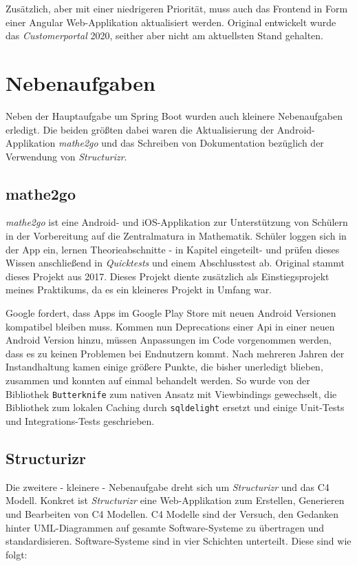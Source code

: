 Zusätzlich, aber mit einer niedrigeren Priorität, muss auch das Frontend in Form einer Angular Web-Applikation aktualisiert werden. Original entwickelt wurde das \textit{Customerportal} 2020, seither aber nicht am aktuellsten Stand gehalten.

\section{Nebenaufgaben}

Neben der Hauptaufgabe um Spring Boot wurden auch kleinere Nebenaufgaben erledigt. Die beiden größten dabei waren die Aktualisierung der Android-Applikation \textit{mathe2go} und das Schreiben von Dokumentation bezüglich der Verwendung von \textit{Structurizr}. 

\subsection{mathe2go}

\textit{mathe2go} ist eine Android- und iOS-Applikation zur Unterstützung von Schülern in der Vorbereitung auf die Zentralmatura in Mathematik. Schüler loggen sich in der App ein, lernen Theorieabschnitte - in Kapitel eingeteilt- und prüfen dieses Wissen anschließend in \textit{Quicktests} und einem Abschlusstest ab. Original stammt dieses Projekt aus 2017. Dieses Projekt diente zusätzlich als Einstiegsprojekt meines Praktikums, da es ein kleineres Projekt in Umfang war.

Google fordert, dass Apps im Google Play Store mit neuen Android Versionen kompatibel bleiben muss. Kommen nun Deprecations einer Api in einer neuen Android Version hinzu, müssen Anpassungen im Code vorgenommen werden, dass es zu keinen Problemen bei Endnutzern kommt. Nach mehreren Jahren der Instandhaltung kamen einige größere Punkte, die bisher unerledigt blieben, zusammen und konnten auf einmal behandelt werden. So wurde von der Bibliothek \texttt{Butterknife} zum nativen Ansatz mit Viewbindings gewechselt, die Bibliothek zum lokalen Caching durch \texttt{sqldelight} ersetzt und einige Unit-Tests und Integrations-Tests geschrieben.

\subsection{Structurizr}

Die zweitere - kleinere - Nebenaufgabe dreht sich um \textit{Structurizr} und das C4 Modell. Konkret ist \textit{Structurizr} eine Web-Applikation zum Erstellen, Generieren und Bearbeiten von C4 Modellen. C4 Modelle sind der Versuch, den Gedanken hinter UML-Diagrammen auf gesamte Software-Systeme zu übertragen und standardisieren. Software-Systeme sind in vier Schichten unterteilt. Diese sind wie folgt:

